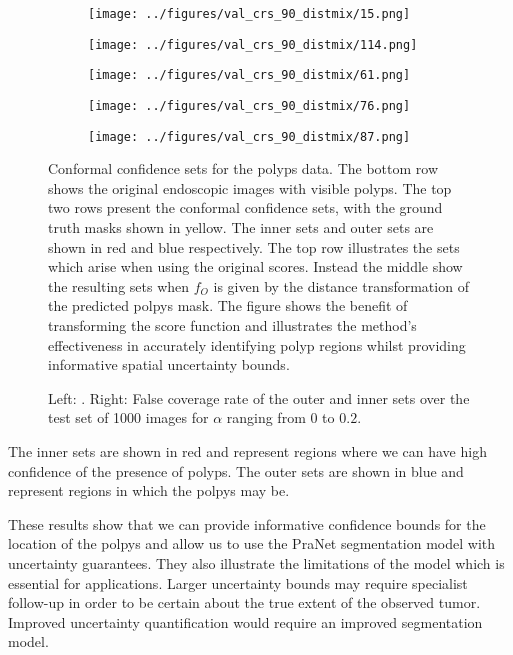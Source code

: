 \begin{figure}
\begin{subfigure}{0.19\textwidth}
		\centering
		\texttt{[image: ../figures/val\_crs\_90\_distmix/15.png]}
		\label{fig:1}
	\end{subfigure}
	\begin{subfigure}{0.19\textwidth}
		\centering
		\texttt{[image: ../figures/val\_crs\_90\_distmix/114.png]}
		\label{fig:1}
	\end{subfigure}
	\begin{subfigure}{0.19\textwidth}
		\centering
		\texttt{[image: ../figures/val\_crs\_90\_distmix/61.png]}
		\label{fig:1}
	\end{subfigure}
	\begin{subfigure}{0.19\textwidth}
		\centering
		\texttt{[image: ../figures/val\_crs\_90\_distmix/76.png]}
		\label{fig:1}
	\end{subfigure}
	\begin{subfigure}{0.19\textwidth}
		\centering
		\texttt{[image: ../figures/val\_crs\_90\_distmix/87.png]}
		\label{fig:1}
	\end{subfigure}
	\label{fig:grid}
	\caption{Conformal confidence sets for the polyps data. The bottom row shows the original endoscopic images with visible polyps. The top two rows present the conformal confidence sets, with the ground truth masks shown in yellow. The inner sets and outer sets are shown in red and blue respectively. The top row illustrates the sets which arise when using the original scores. Instead the middle show the resulting sets when $f_O$ is given by the distance transformation of the predicted polpys mask. The figure shows the benefit of transforming the score function and illustrates the method's effectiveness in accurately identifying polyp regions whilst providing informative spatial uncertainty bounds.}\label{fig:polpys}
\end{figure}

\begin{figure}
	
	\caption{Left: . Right: False coverage rate of the outer and inner sets over the test set of 1000 images for $\alpha$ ranging from 0 to $0.2$.  }\label{fig:dist}
\end{figure}

The inner sets are shown in red and represent regions where we can have high confidence of the presence of polyps. The outer sets are shown in blue and represent regions in which the polpys may be.

These results show that we can provide informative confidence bounds for the location of the polpys and allow us to use the PraNet segmentation model with uncertainty guarantees. They also illustrate the limitations of the model which is essential for applications. Larger uncertainty bounds may require specialist follow-up in order to be certain about the true extent of the observed tumor. Improved uncertainty quantification would require an improved segmentation model. 

